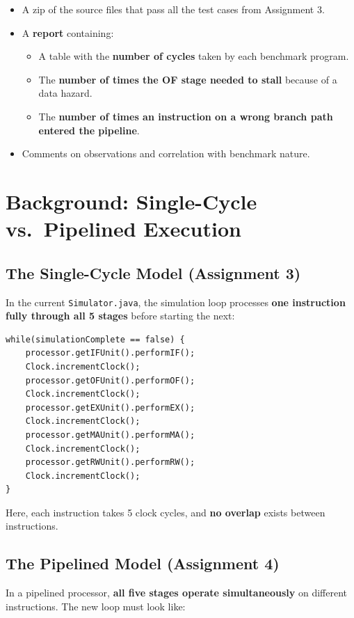\documentclass[12pt,a4paper]{article}
\begin{document}
\begin{itemize}
    \item A zip of the source files that pass all the test cases from Assignment 3.
    \item A \textbf{report} containing:
    \begin{itemize}
        \item A table with the \textbf{number of cycles} taken by each benchmark program.
        \item The \textbf{number of times the OF stage needed to stall} because of a data hazard.
        \item The \textbf{number of times an instruction on a wrong branch path entered the pipeline}.
    \end{itemize}
    \item Comments on observations and correlation with benchmark nature.
\end{itemize}

\section{Background: Single-Cycle vs.\ Pipelined Execution}

\subsection{The Single-Cycle Model (Assignment 3)}
In the current \texttt{Simulator.java}, the simulation loop processes \textbf{one instruction fully through all 5 stages} before starting the next:

\begin{lstlisting}[style=javastyle, caption={Current single-cycle simulation loop}]
while(simulationComplete == false) {
    processor.getIFUnit().performIF();
    Clock.incrementClock();
    processor.getOFUnit().performOF();
    Clock.incrementClock();
    processor.getEXUnit().performEX();
    Clock.incrementClock();
    processor.getMAUnit().performMA();
    Clock.incrementClock();
    processor.getRWUnit().performRW();
    Clock.incrementClock();
}
\end{lstlisting}

Here, each instruction takes 5 clock cycles, and \textbf{no overlap} exists between instructions.

\subsection{The Pipelined Model (Assignment 4)}
In a pipelined processor, \textbf{all five stages operate simultaneously} on different instructions. The new loop must look like:
\end{document}
